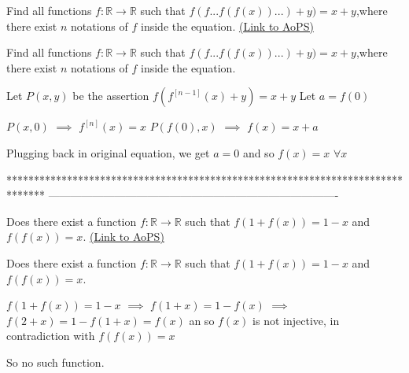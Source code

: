 \begin{problem}
	Find all functions $f: \mathbb{R}\to\mathbb{R}$ such that $f(f...f(f(x))...)+y)=x+y$,where there exist $n$ notations of $f$ inside the equation.
	\flushright \href{https://artofproblemsolving.com/community/c6h565054}{(Link to AoPS)}
\end{problem}



\begin{solution}
	\begin{tcolorbox}Find all functions $f: \mathbb{R}\to\mathbb{R}$ such that $f(f...f(f(x))...)+y)=x+y$,where there exist $n$ notations of $f$ inside the equation.\end{tcolorbox}
Let $P(x,y)$ be the assertion $f(f^{[n-1]}(x)+y)=x+y$
Let $a=f(0)$

$P(x,0)$ $\implies$ $f^{[n]}(x)=x$
$P(f(0),x)$ $\implies$ $f(x)=x+a$

Plugging back in original equation, we get $a=0$ and so $\boxed{f(x)=x}$ $\forall x$
\end{solution}
*******************************************************************************
-------------------------------------------------------------------------------

\begin{problem}
	Does there exist a function $f: \mathbb{R}\to\mathbb{R}$ such that $f(1+f(x))=1-x$ and $f(f(x))=x$.
	\flushright \href{https://artofproblemsolving.com/community/c6h565055}{(Link to AoPS)}
\end{problem}



\begin{solution}
	\begin{tcolorbox}Does there exist a function $f: \mathbb{R}\to\mathbb{R}$ such that $f(1+f(x))=1-x$ and $f(f(x))=x$.\end{tcolorbox}

$f(1+f(x))=1-x$ $\implies$ $f(1+x)=1-f(x)$ $\implies$ $f(2+x)=1-f(1+x)=f(x)$ an so $f(x)$ is not injective, in contradiction with $f(f(x))=x$

So no such function.
\end{solution}



